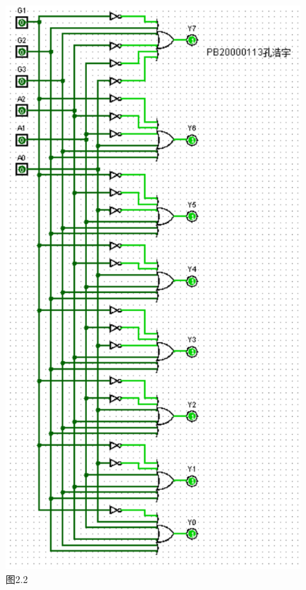 \documentclass{article}
\begin{document}
\begin{enumerate}
\begin{figure}[h]
                \includegraphics[scale=0.6]{t22.png}
                \caption*{图2.2}
            \end{figure}
        \end{enumerate}
        \clearpage
\end{document}
